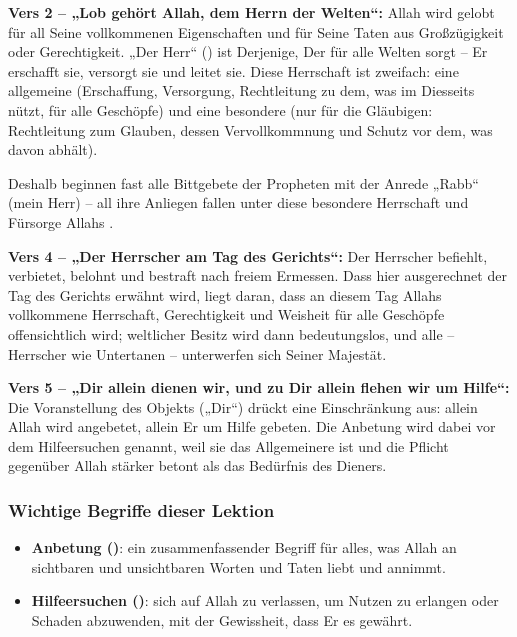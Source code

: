 \textbf{Vers 2 – „Lob gehört Allah, dem Herrn der Welten“:} Allah  wird gelobt für all Seine
vollkommenen Eigenschaften und für Seine Taten aus Großzügigkeit oder Gerechtigkeit. „Der
Herr“ () ist Derjenige, Der für alle Welten sorgt – Er erschafft sie, versorgt sie und leitet
sie. Diese Herrschaft ist zweifach: eine allgemeine (Erschaffung, Versorgung, Rechtleitung zu
dem, was im Diesseits nützt, für alle Geschöpfe) und eine besondere (nur für die Gläubigen:
Rechtleitung zum Glauben, dessen Vervollkommnung und Schutz vor dem, was davon abhält).

\begin{merke}
Deshalb beginnen fast alle Bittgebete der Propheten mit der Anrede „Rabb“ (mein Herr) – all
ihre Anliegen fallen unter diese besondere Herrschaft und Fürsorge Allahs .
\end{merke}

\textbf{Vers 4 – „Der Herrscher am Tag des Gerichts“:} Der Herrscher befiehlt, verbietet, belohnt
und bestraft nach freiem Ermessen. Dass hier ausgerechnet der Tag des Gerichts erwähnt wird,
liegt daran, dass an diesem Tag Allahs vollkommene Herrschaft, Gerechtigkeit und Weisheit für
alle Geschöpfe offensichtlich wird; weltlicher Besitz wird dann bedeutungslos, und alle –
Herrscher wie Untertanen – unterwerfen sich Seiner Majestät.

\textbf{Vers 5 – „Dir allein dienen wir, und zu Dir allein flehen wir um Hilfe“:} Die Voranstellung
des Objekts („Dir“) drückt eine Einschränkung aus: allein Allah wird angebetet, allein Er um
Hilfe gebeten. Die Anbetung wird dabei vor dem Hilfeersuchen genannt, weil sie das
Allgemeinere ist und die Pflicht gegenüber Allah stärker betont als das Bedürfnis des Dieners.

\subsubsection*{Wichtige Begriffe dieser Lektion}
\begin{itemize}[leftmargin=1.4em]
  \item \textbf{Anbetung ()}: ein zusammenfassender Begriff für alles, was Allah 
        an sichtbaren und unsichtbaren Worten und Taten liebt und annimmt.
  \item \textbf{Hilfeersuchen ()}: sich auf Allah  zu verlassen, um Nutzen zu
        erlangen oder Schaden abzuwenden, mit der Gewissheit, dass Er es gewährt.
\end{itemize}

